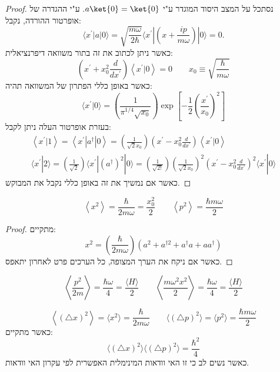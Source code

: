 \documentclass{tstextbook}
\begin{document}
\begin{proof}
נסתכל על המצב היסוד המוגדר ע"י \(a\ket{0}=\ket{0}\). ע"י ההגדרה של אופרטור ההורדה, נקבל:
$$\langle x^{\prime}|a|0\rangle=\sqrt{\frac{m\omega}{2\hbar}}\langle x^{\prime}|\left(x+\frac{i p}{m\omega}\right)|0\rangle=0.$$
כאשר ניתן לכתוב את זה בתור משוואה דיפרנציאלית:
$$\left(x^{\prime}+x_{0}^{2}\frac{d}{d x^{\prime}}\right)\left\langle  x^{\prime}|0 \right\rangle=0\qquad x_{0}\equiv{\sqrt{\frac{\hbar}{m\omega}}}$$
כאשר באופן כללי הפתרון של המשוואה תהיה:
$$\langle x^{\prime}|0\rangle=\left(\frac{1}{\pi^{1/4}\sqrt{x_{0}}}\right)\exp{\left[-\frac{1}{2}\left(\frac{x^{\prime}}{x_{0}}\right)^{2}\right]}$$
בעזרת אופרטור העלה ניתן לקבל:
\begin{gather*}\left\langle  x^{\prime}|1 \right\rangle=\left\langle  x^{\prime}|a^{\dagger}|0 \right\rangle=\left(\frac{1}{\sqrt{2}x_{0}}\right)\left(x^{\prime}-x_{0}^{2}\frac{d}{d x^{\prime}}\right)\left\langle  x^{\prime}|0 \right\rangle  \\\langle x^{\prime}|2\rangle=\left(\frac{1}{\sqrt{2}}\right)\langle x^{\prime}|(a^{\dagger})^{2}|0\rangle=\left(\frac{1}{\sqrt{2!}}\right)\left(\frac{1}{\sqrt{2}x_{0}}\right)^{2}\left(x^{\prime}-x_{0}^{2}\frac{d}{d x^{\prime}}\right)^{2}\langle x^{\prime}|0\rangle
\end{gather*}
כאשר אם נמשיך את זה באופן כללי נקבל את המבוקש.

\end{proof}
\begin{proposition}
$$\left\langle x^{2}\right\rangle=\frac\hbar{2m\omega}=\frac{x_{0}^{2}}2 \qquad \left\langle p^{2}\right\rangle=\frac{\hbar m\omega}{2}$$

\end{proposition}
\begin{proof}
מתקיים:
$$x^{2}=\left(\frac{\hbar}{2m\omega}\right)\left(a^{2}+a^{\dagger2}+a^{\dagger}a+a a^{\dagger}\right)$$
כאשר אם ניקח את הערך המצופה, כל הערכים פרט לאחרון יתאפס.

\end{proof}
\begin{proposition}
$$\left\langle\frac{p^{2}}{2m}\right\rangle=\frac{\hbar\omega}{4}=\frac{\langle H\rangle}{2}\qquad \left\langle\frac{m\omega^{2}x^{2}}{2}\right\rangle=\frac{\hbar\omega}{4}=\frac{\langle H\rangle}{2}$$

\end{proposition}
\begin{proposition}
$$\left\langle \left( \triangle x \right)^{2} \right\rangle=\langle x^{2}\rangle={\frac{\hbar}{2m\omega}}\qquad  \langle(\triangle p)^{2}\rangle=\langle p^{2}\rangle=\frac{\hbar m\omega}{2}$$
כאשר מתקיים:
$$\langle(\triangle x)^{2}\rangle\langle(\triangle p)^{2}\rangle={\frac{\hbar^{2}}{4}}$$
כאשר נשים לב כי זו האי וודאות המינימלית האפשרית לפי עקרון האי וודאות.

\end{proposition}
\end{document}
